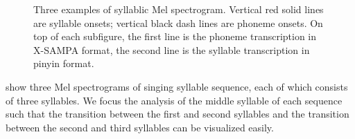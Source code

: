 \begin{figure}[ht!]
    \centering
    \hfill
    \hfill

  
    \caption[]{Three examples of syllablic Mel spectrogram. Vertical red solid lines are syllable onsets; vertical black dash lines are phoneme onsets. On top of each subfigure, the first line is the phoneme transcription in X-SAMPA format, the second line is the syllable transcription in pinyin format.}
    \label{fig:ch4:task1_visualization}
\end{figure}

 show three Mel spectrograms of singing syllable sequence, each of which consists of three syllables. We focus the analysis of the middle syllable of each sequence such that the transition between the first and second syllables and the transition between the second and third syllables can be visualized easily. 

